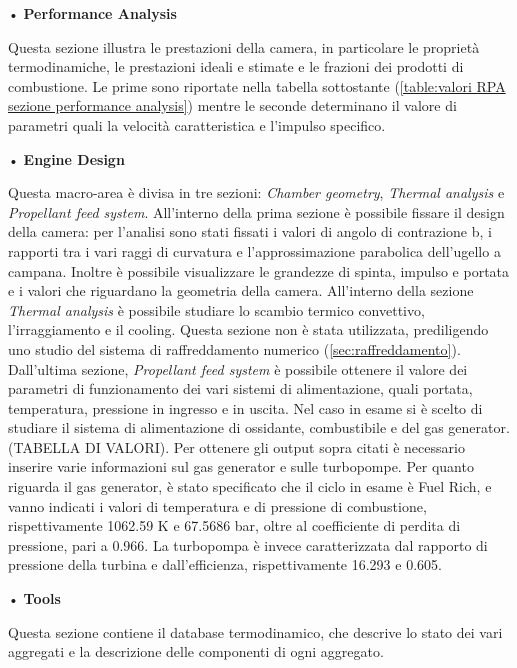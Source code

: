 • \textbf{Performance Analysis}

Questa sezione illustra le prestazioni della camera, in particolare le proprietà termodinamiche, le prestazioni ideali e stimate e le frazioni dei prodotti di combustione. Le prime sono riportate nella tabella sottostante (\autoref{table:valori RPA sezione performance analysis}) mentre le seconde determinano il valore di parametri quali la velocità caratteristica e l'impulso specifico. 

• \textbf{Engine Design}

Questa macro-area è divisa in tre sezioni: \textit{Chamber geometry}, \textit{Thermal analysis} e \textit{Propellant feed system}.
All'interno della prima sezione è possibile fissare il design della camera: per l'analisi sono stati fissati i valori di angolo di contrazione b, i rapporti tra i vari raggi di curvatura e l'approssimazione parabolica dell'ugello a campana. Inoltre è possibile visualizzare le grandezze di spinta, impulso e portata e i valori che riguardano la geometria della camera.
All'interno della sezione \textit{Thermal analysis} è possibile studiare lo scambio termico convettivo, l'irraggiamento e il cooling. Questa sezione non è stata utilizzata, prediligendo uno studio del sistema di raffreddamento numerico (\autoref{sec:raffreddamento}).
Dall'ultima sezione, \textit{Propellant feed system} è possibile ottenere il valore dei parametri di funzionamento dei vari sistemi di alimentazione, quali portata, temperatura, pressione in ingresso e in uscita. Nel caso in esame si è scelto di studiare il sistema di alimentazione di ossidante, combustibile e del gas generator. (TABELLA DI VALORI). Per ottenere gli output sopra citati è necessario inserire varie informazioni sul gas generator e sulle turbopompe. Per quanto riguarda il gas generator, è stato specificato che il ciclo in esame è Fuel Rich, e vanno indicati i valori di temperatura e di pressione di combustione, rispettivamente 1062.59 K e 67.5686 bar, oltre al coefficiente di perdita di pressione, pari a 0.966. La turbopompa è invece caratterizzata dal rapporto di pressione della turbina e dall'efficienza, rispettivamente 16.293 e 0.605. 

• \textbf{Tools}

Questa sezione contiene il database termodinamico, che descrive lo stato dei vari aggregati e la descrizione delle componenti di ogni aggregato.

